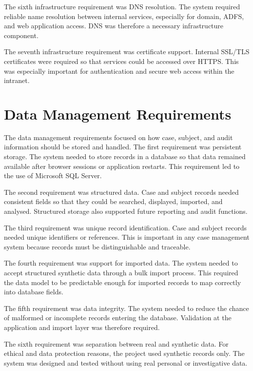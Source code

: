 The sixth infrastructure requirement was DNS resolution. The system required reliable name resolution between internal services, especially for domain, ADFS, and web application access. DNS was therefore a necessary infrastructure component.

The seventh infrastructure requirement was certificate support. Internal SSL/TLS certificates were required so that services could be accessed over HTTPS. This was especially important for authentication and secure web access within the intranet.


\section{Data Management Requirements}

The data management requirements focused on how case, subject, and audit information should be stored and handled. The first requirement was persistent storage. The system needed to store records in a database so that data remained available after browser sessions or application restarts. This requirement led to the use of Microsoft SQL Server.

The second requirement was structured data. Case and subject records needed consistent fields so that they could be searched, displayed, imported, and analysed. Structured storage also supported future reporting and audit functions.

The third requirement was unique record identification. Case and subject records needed unique identifiers or references. This is important in any case management system because records must be distinguishable and traceable.

The fourth requirement was support for imported data. The system needed to accept structured synthetic data through a bulk import process. This required the data model to be predictable enough for imported records to map correctly into database fields.

The fifth requirement was data integrity. The system needed to reduce the chance of malformed or incomplete records entering the database. Validation at the application and import layer was therefore required.

The sixth requirement was separation between real and synthetic data. For ethical and data protection reasons, the project used synthetic records only. The system was designed and tested without using real personal or investigative data.

